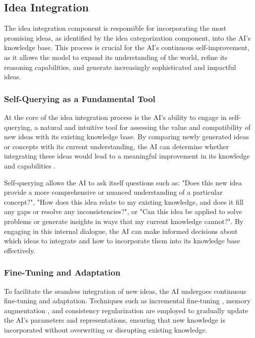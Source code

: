 \documentclass[conference]{article}
\begin{document}
	
	\subsection{Idea Integration}
	The idea integration component is responsible for incorporating the most promising ideas, as identified by the idea categorization component, into the AI's knowledge base. This process is crucial for the AI's continuous self-improvement, as it allows the model to expand its understanding of the world, refine its reasoning capabilities, and generate increasingly sophisticated and impactful ideas.
	
	\subsubsection{Self-Querying as a Fundamental Tool}
	At the core of the idea integration process is the AI's ability to engage in self-querying, a natural and intuitive tool for assessing the value and compatibility of new ideas with its existing knowledge base. By comparing newly generated ideas or concepts with its current understanding, the AI can determine whether integrating these ideas would lead to a meaningful improvement in its knowledge and capabilities \cite{petroni2019language, jiang2020can}.
	
	Self-querying allows the AI to ask itself questions such as: "Does this new idea provide a more comprehensive or nuanced understanding of a particular concept?", "How does this idea relate to my existing knowledge, and does it fill any gaps or resolve any inconsistencies?", or "Can this idea be applied to solve problems or generate insights in ways that my current knowledge cannot?". By engaging in this internal dialogue, the AI can make informed decisions about which ideas to integrate and how to incorporate them into its knowledge base effectively.
	
	\subsubsection{Fine-Tuning and Adaptation}
	To facilitate the seamless integration of new ideas, the AI undergoes continuous fine-tuning and adaptation. Techniques such as incremental fine-tuning \cite{gururangan2020don}, memory augmentation \cite{rae2019compressive}, and consistency regularization \cite{liang2020alice} are employed to gradually update the AI's parameters and representations, ensuring that new knowledge is incorporated without overwriting or disrupting existing knowledge.
	
\end{document}
